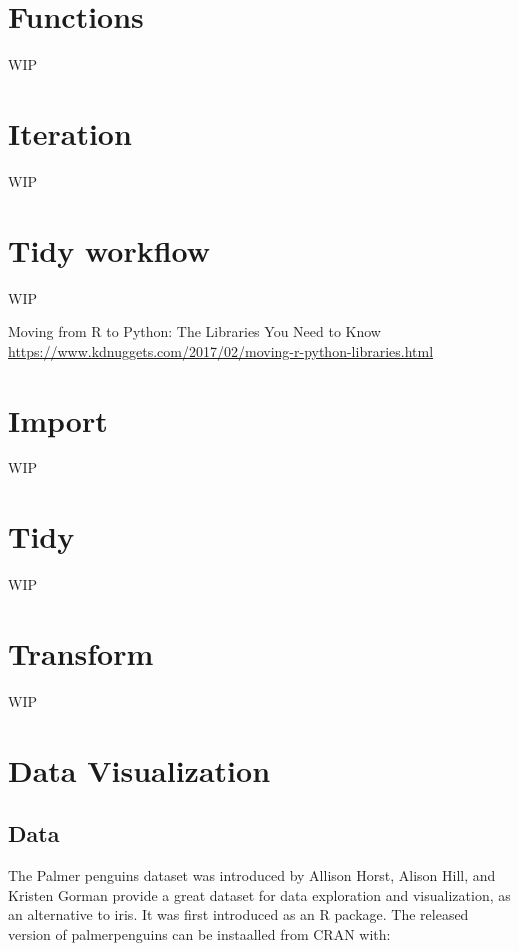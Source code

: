 \documentclass[
]{book}
\begin{document}
\hypertarget{functions}{%
\chapter{Functions}\label{functions}}

WIP

\hypertarget{iteration}{%
\chapter{Iteration}\label{iteration}}

WIP

\hypertarget{tidy-workflow}{%
\chapter{Tidy workflow}\label{tidy-workflow}}

WIP

Moving from R to Python: The Libraries You Need to Know \url{https://www.kdnuggets.com/2017/02/moving-r-python-libraries.html}

\hypertarget{import}{%
\chapter{Import}\label{import}}

WIP

\hypertarget{tidy}{%
\chapter{Tidy}\label{tidy}}

WIP

\hypertarget{transform}{%
\chapter{Transform}\label{transform}}

WIP

\hypertarget{data-visualization}{%
\chapter{Data Visualization}\label{data-visualization}}

\hypertarget{data}{%
\section{Data}\label{data}}

The Palmer penguins dataset was introduced by Allison Horst, Alison Hill, and Kristen Gorman provide a great dataset for data exploration and visualization, as an alternative to iris. It was first introduced as an R package. The released version of palmerpenguins can be instaalled from CRAN with:
\end{document}
